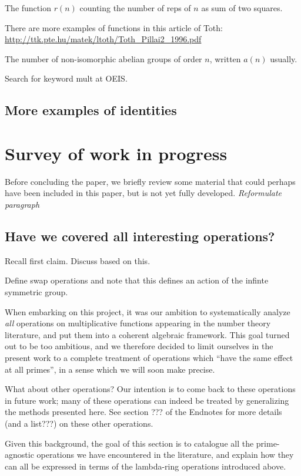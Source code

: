 \documentclass[a4paper]{article}
\begin{document}
The function $r(n)$ counting the number of reps of $n$ as sum of two squares.

There are more examples of functions in this article of Toth: \url{http://ttk.pte.hu/matek/ltoth/Toth_Pillai2_1996.pdf}

The number of non-isomorphic abelian groups of order $n$, written $a(n)$ usually.

Search for keyword mult at OEIS.

\subsection{More examples of identities}





\section{Survey of work in progress}

Before concluding the paper, we briefly review some material that could perhaps have been included in this paper, but is not yet fully developed.  \emph{Reformulate paragraph}

\subsection{Have we covered all interesting operations?}

Recall first claim. Discuss based on this. 

Define swap operations and note that this defines an action of the infinte symmetric group.

When embarking on this project, it was our ambition to systematically analyze \emph{all} operations on multiplicative functions appearing in the number theory literature, and put them into a coherent algebraic framework. This goal turned out to be too ambitious, and we therefore decided to limit ourselves in the present work to a complete treatment of operations which ``have the same effect at all primes'', in a sense which we will soon make precise.

What about other operations? Our intention is to come back to these operations in future work; many of these operations can indeed be treated by generalizing the methods presented here. See section ??? of the Endnotes for more details (and a list???) on these other operations. 

Given this background, the goal of this section is to catalogue all the prime-agnostic operations we have encountered in the literature, and explain how they can all be expressed in terms of the lambda-ring operations introduced above.
\end{document}
